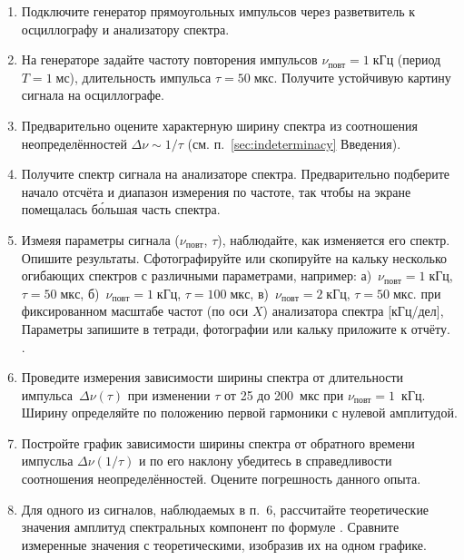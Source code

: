 \begin{lab:task}
\begin{enumerate}
\item Подключите генератор прямоугольных импульсов через разветвитель
к осциллографу и анализатору спектра.

\item На генераторе задайте частоту повторения импульсов
$\nu_{повт} = 1\;кГц$ (период $T=1\;мс$), длительность импульса
$\tau=50\;мкс$. Получите устойчивую картину сигнала на осциллографе.

\item Предварительно оцените характерную ширину спектра
из соотношения неопределённостей $\Delta \nu \sim 1/\tau$
(см.  п.~\ref{sec:indeterminacy} Введения).

\item Получите спектр сигнала на анализаторе спектра. Предварительно
подберите начало отсчёта и диапазон измерения по частоте,
так чтобы на экране помещалась б\'{о}льшая часть спектра.

\item Измеяя параметры сигнала ($\nu_{повт}$, $\tau$),
наблюдайте, как изменяется его спектр. Опишите результаты.
Сфотографируйте или скопируйте на кальку несколько огибающих спектров
с различными параметрами, например:
а)~$\nu_{повт}=1\;кГц$, $\tau=50\;мкс$,
б)~$\nu_{повт}=1\;кГц$, $\tau=100\;мкс$,
в)~$\nu_{повт}=2\;кГц$, $\tau=50\;мкс$.
при фиксированном масштабе частот (по оси $X$) анализатора спектра [кГц/дел],
Параметры запишите в тетради, фотографии или кальку приложите к отчёту.
.

\item Проведите измерения зависимости ширины спектра от длительности
импульса~$\Delta \nu(\tau)$ при изменении $\tau$ от 25 до 200~мкс при
$\nu_\text{повт}=1$~кГц. Ширину определяйте по положению первой гармоники
с нулевой амплитудой.

\item Постройте график зависимости ширины спектра от обратного времени импусльа
$\Delta \nu(1/\tau)$ и по его наклону убедитесь в справедливости соотношения
неопределённостей. Оцените погрешность данного опыта.

\item Для одного из сигналов, наблюдаемых в п.~6, рассчитайте теоретические
значения амплитуд спектральных компонент по формуле .
Сравните измеренные значения с теоретическими, изобразив их на одном графике.

\end{enumerate}



\end{lab:task}
